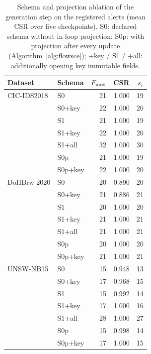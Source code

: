 \begin{table}[t]
\centering\footnotesize
\caption{Schema and projection ablation of the generation step on the registered alerts (mean CSR over five checkpoints). S0: declared schema without in-loop projection; S0p: with projection after every update (Algorithm~\ref{alg:flowsce}); +key / S1 / +all: additionally opening key immutable fields.}
\label{tab:a-projection}
\begin{tabular}{@{}llrrr@{}}
\toprule
Dataset & Schema & $F_{\rm mut}$ & CSR & $s_\epsilon$ \\
\midrule
CIC-IDS2018 & S0 & 21 & 1.000 & 19 \\
 & S0+key & 22 & 1.000 & 20 \\
 & S1 & 21 & 1.000 & 19 \\
 & S1+key & 22 & 1.000 & 20 \\
 & S1+all & 32 & 1.000 & 30 \\
 & S0p & 21 & 1.000 & 19 \\
 & S0p+key & 22 & 1.000 & 20 \\
\midrule
DoHBrw-2020 & S0 & 20 & 0.890 & 20 \\
 & S0+key & 21 & 0.886 & 21 \\
 & S1 & 20 & 1.000 & 20 \\
 & S1+key & 21 & 1.000 & 21 \\
 & S1+all & 21 & 1.000 & 21 \\
 & S0p & 20 & 1.000 & 20 \\
 & S0p+key & 21 & 1.000 & 21 \\
\midrule
UNSW-NB15 & S0 & 15 & 0.948 & 13 \\
 & S0+key & 17 & 0.968 & 15 \\
 & S1 & 15 & 0.992 & 14 \\
 & S1+key & 17 & 1.000 & 16 \\
 & S1+all & 28 & 1.000 & 27 \\
 & S0p & 15 & 0.998 & 14 \\
 & S0p+key & 17 & 1.000 & 15 \\
\bottomrule
\end{tabular}
\end{table}
